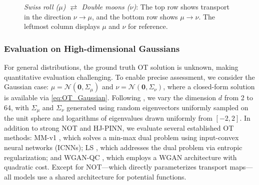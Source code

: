 \documentclass{article} %
\theoremstyle{plain}
\theoremstyle{definition}
\theoremstyle{remark}
\begin{document}
\begin{figure}
    \caption{\textit{Swiss roll ($\mu$) $\rightleftarrows$ Double moons ($\nu$)}: The top row shows transport in the direction $\nu \rightarrow \mu$, and the bottom row shows $\mu \rightarrow \nu$. The leftmost column displays $\mu$ and $\nu$ for reference.}
    \label{fig:2d_spiral_doublemoons}
\end{figure}

\vspace{-0.1cm}

\subsubsection{Evaluation on High-dimensional Gaussians}\label{sec:high_dim_gaussians}
\vspace{-0.5em}
For general distributions, the ground truth OT solution is unknown, making quantitative evaluation challenging. To enable precise assessment, we consider the Gaussian case: $\mu=\mathcal{N}\left(\mathbf{0},\Sigma_\mu\right)$ and $\nu=\mathcal{N}\left(\mathbf{0},\Sigma_\nu\right)$, where a closed-form solution is available via \eqref{eq:OT_Gaussian}.
Following \citet{korotin2021neural}, we vary the dimension $d$ from 2 to 64, with $\Sigma_\mu$ and $\Sigma_\nu$ generated using random eigenvectors uniformly sampled on the unit sphere and logarithms of eigenvalues drawn uniformly from $[-2, 2]$.
In addition to strong NOT and HJ-PINN, we evaluate several established OT methods: MM-v1 \citep{taghvaei20192,korotin2021neural}, which solves a min-max dual problem using input-convex neural networks (ICNNs); LS \citep{seguy2017large}, which addresses the dual problem via entropic regularization; and WGAN-QC \citep{liu2019wasserstein}, which employs a WGAN architecture with quadratic cost. Except for NOT—which directly parameterizes transport maps—all models use a shared architecture for potential functions.
\end{document}
